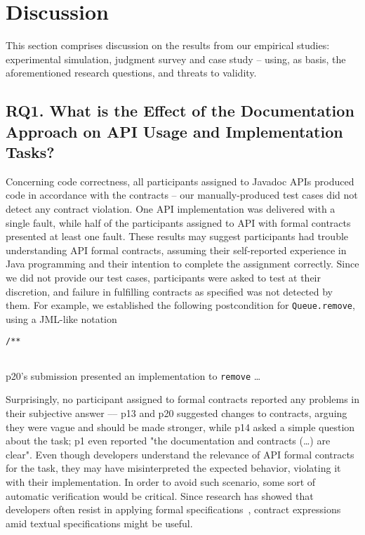 \section{Discussion}
\label{discussion}

This section comprises discussion on the results from our empirical studies: experimental simulation, judgment survey and case study -- using, as basis, the aforementioned research questions, and threats to validity.


\subsection{RQ1. What is the Effect of the Documentation Approach on API Usage and Implementation Tasks?}
\label{rq1}

Concerning code correctness, all participants assigned to Javadoc APIs produced code
in accordance with the contracts -- our manually-produced test cases did not detect any contract violation. One \contractjdoc{} API implementation was delivered with a single fault, while half of the participants assigned to API with formal contracts presented at least one fault.
These results may suggest participants had trouble understanding API formal contracts, assuming their self-reported experience in Java programming and their intention to complete the assignment correctly.
Since we did not provide our test cases, participants were asked to test at their discretion, and failure in fulfilling contracts as specified was not detected by them.
For example, we established the following postcondition for \texttt{Queue.remove}, using a JML-like notation
\begin{lstlisting}[basicstyle=\footnotesize\ttfamily,name=figxpi, frame=lines, mathescape=true]
/**
   
\end{lstlisting}
p20's submission presented an implementation to \texttt{remove} \ldots 

Surprisingly, no participant assigned to formal contracts reported any problems in their subjective answer –– p13 and p20 suggested changes to contracts, arguing they were vague and should be made stronger, while p14 asked a simple question about the task; p1 even reported "the documentation and contracts (\ldots) are clear".
Even though developers understand the relevance of API formal contracts for the task, they may have misinterpreted the expected behavior, violating it with their implementation.
In order to avoid such scenario, some sort of automatic verification would be critical.
Since research has showed that developers often resist in applying formal specifications~\cite{}, contract expressions amid textual specifications might be useful.

